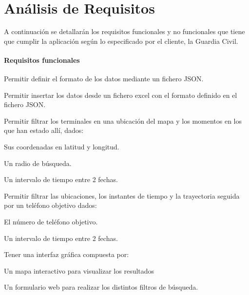 \section{Análisis de Requisitos\label{SEC:ANALISIS}}
  A continuación se detallarán los requisitos funcionales y no funcionales que tiene que cumplir la aplicación según lo especificado por el cliente, la Guardia Civil.
  \paragraph{Requisitos funcionales}
  
  \begin{functional}
    \item Permitir definir el formato de los datos mediante un fichero JSON.
    \item Permitir insertar los datos desde un fichero excel con el formato definido en el fichero JSON.
    
    
    \item Permitir filtrar los terminales en una ubicación del mapa y los momentos en los que han estado allí, dados:
    \begin{functional}
      \item Sus coordenadas en latitud y longitud.
      \item Un radio de búsqueda.
      \item Un intervalo de tiempo entre 2 fechas.
    \end{functional}
   
    \item Permitir filtrar las ubicaciones, los instantes de tiempo y la trayectoria seguida por un teléfono objetivo dados:
    \begin{functional}
      \item El número de teléfono objetivo.
      \item Un intervalo de tiempo entre 2 fechas.
    \end{functional} 
  
    
    \item Tener una interfaz gráfica compuesta por:
    \begin{functional}
      \item Un mapa interactivo para visualizar los resultados
      \item Un formulario web para realizar los distintos filtros de búsqueda.
    \end{functional}
  \end{functional}
  
